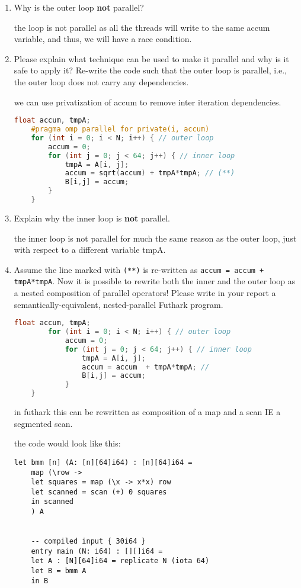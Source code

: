\documentclass{article}
\begin{document}
\begin{enumerate}
    \item Why is the outer loop \textbf{not} parallel? 
    
    the loop is not parallel as all the threads will write to the same accum variable, and thus, we will have a race condition.

    \item Please explain what technique can be used to make it parallel and why is it safe to apply it?
  Re-write the code such that the outer loop is parallel, 
        i.e., the outer loop does not carry any dependencies.

    we can use privatization of accum to remove inter iteration dependencies.
    \begin{lstlisting}[language=c]
    float accum, tmpA;
    #pragma omp parallel for private(i, accum)
    for (int i = 0; i < N; i++) { // outer loop
        accum = 0;
        for (int j = 0; j < 64; j++) { // inner loop
            tmpA = A[i, j];
            accum = sqrt(accum) + tmpA*tmpA; // (**)
            B[i,j] = accum;
        }
    }
    \end{lstlisting}


    \item Explain why the inner loop is \textbf{not} parallel.
    
    the inner loop is not parallel for much the same reason as the outer loop, just with respect to a different variable tmpA.

    \item Assume the line marked with \texttt{(**)} is re-written as \texttt{accum = accum + tmpA*tmpA}.
  Now it is possible to rewrite both the inner and the outer loop as a nested 
    composition of parallel operators! Please write in your report a 
    semantically-equivalent, nested-parallel Futhark program.

    \begin{lstlisting}[language=c]
        float accum, tmpA;
        for (int i = 0; i < N; i++) { // outer loop
            accum = 0;
            for (int j = 0; j < 64; j++) { // inner loop
                tmpA = A[i, j];
                accum = accum  + tmpA*tmpA; // 
                B[i,j] = accum;
            }
    }
    \end{lstlisting}

    in futhark this can be rewritten as composition of a map and a scan IE a segmented scan.

    the code would look like this:

    \begin{lstlisting}[language=futhark]
    let bmm [n] (A: [n][64]i64) : [n][64]i64 =
    map (\row ->
    let squares = map (\x -> x*x) row
    let scanned = scan (+) 0 squares
    in scanned
    ) A


    -- compiled input { 30i64 }
    entry main (N: i64) : [][]i64 = 
    let A : [N][64]i64 = replicate N (iota 64)
    let B = bmm A
    in B
  
    \end{lstlisting}


\end{enumerate}
\end{document}
